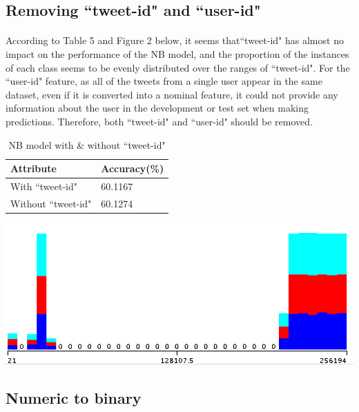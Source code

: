 \documentclass[11pt]{article}
\begin{document}
\subsection{Removing ``tweet-id" and ``user-id"}

\paragraph{} According to Table 5 and Figure 2 below, it seems that``tweet-id" has almost no impact on the performance of the NB model, and the proportion of the instances of each class seems to be evenly distributed over the ranges of ``tweet-id". For the ``user-id" feature, as all of the tweets from a single user appear in the same dataset, even if it is converted into a nominal feature, it could not provide any information about the user in the development or test set when making predictions. Therefore, both ``tweet-id" and ``user-id" should be removed.

\begin{table}[!htbp]
 \begin{center}
\begin{tabular}{| l | l |}
      \hline
      Attribute & Accuracy(\%) \\
      \hline\hline
      With ``tweet-id" & 60.1167 \\
      Without ``tweet-id" & 60.1274 \\
      \hline
\end{tabular}
\caption{NB model with \& without ``tweet-id"}\label{table2}
 \end{center}
\end{table}

\includegraphics[scale=0.4]{"tid-class"}

\subsection{Numeric to binary}
\end{document}
